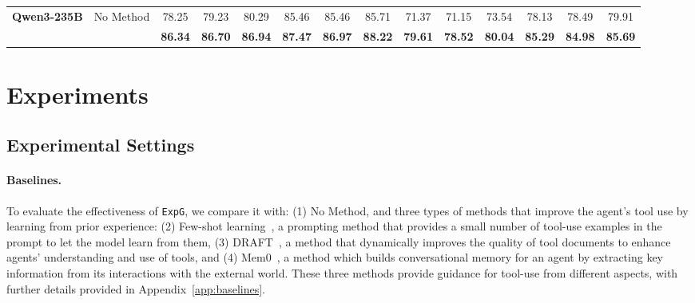 \documentclass[11pt]{article}
\newcommand{\ours}{\texttt{ExpG}}
\begin{document}
\begin{table}[t]
\begin{tabular}{@{}ll*{12}{c}@{}}
    \midrule
    \multirow{2}{*}{\textbf{Qwen3-235B}}
        & No Method & 78.25 & 79.23 & 80.29 & 85.46 & 85.46 & 85.71 & 71.37 & 71.15 & 73.54 & 78.13 & 78.49 & 79.91 \\
        & \cellcolor{gray!15}{\ours} & \cellcolor{gray!15}\textbf{86.34} & \cellcolor{gray!15}\textbf{86.70} & \cellcolor{gray!15}\textbf{86.94} & \cellcolor{gray!15}\textbf{87.47} & \cellcolor{gray!15}\textbf{86.97} & \cellcolor{gray!15}\textbf{88.22} & \cellcolor{gray!15}\textbf{79.61} & \cellcolor{gray!15}\textbf{78.52} & \cellcolor{gray!15}\textbf{80.04} & \cellcolor{gray!15}\textbf{85.29} & \cellcolor{gray!15}\textbf{84.98} & \cellcolor{gray!15}\textbf{85.69} \\
    \bottomrule
    \end{tabular}
    \label{tab:main}
\end{table}

\section{Experiments}
\subsection{Experimental Settings}

\paragraph{Baselines.} 
To evaluate the effectiveness of {\ours}, we compare it with: (1) No Method, and three types of methods that improve the agent's tool use by learning from prior experience: (2) Few-shot learning~\cite{fewshot}, a prompting method that provides a small number of tool-use examples in the prompt to let the model learn from them, (3) DRAFT~\cite{Draft}, a method that dynamically improves the quality of tool documents to enhance agents' understanding and use of tools, and (4) Mem0~\citep{chhikara2025mem0}, a method which builds conversational memory for an agent by extracting key information from its interactions with the external world. 
These three methods provide guidance for tool-use from different aspects, with further details provided in Appendix~\ref{app:baselines}. 
\end{document}
